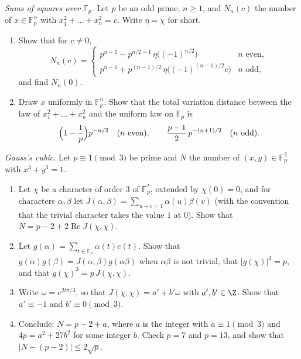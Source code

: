 \begin{exercise}[$\star\star$]\label{pb:sumsquares}
\emph{Sums of squares over $\mathbb F_p$.} Let $p$ be an odd prime, $n\ge1$, and $N_n(c)$ the number of $x\in\mathbb F_p^n$ with
$x_1^2+\dots+x_n^2=c$. Write $\eta=\chi$ for short.
\begin{enumerate}[label=(\alph*)]
\item Show that for $c\ne0$,
\[
N_n(c)=\begin{cases}p^{n-1}-p^{n/2-1}\,\eta\bigl((-1)^{n/2}\bigr)&n\text{ even},\\[2pt]
p^{n-1}+p^{(n-1)/2}\,\eta\bigl((-1)^{(n-1)/2}c\bigr)&n\text{ odd},\end{cases}
\]
and find $N_n(0)$.
\item Draw $x$ uniformly in $\mathbb F_p^n$. Show that the total variation distance between the law of $x_1^2+\dots+x_n^2$ and
the uniform law on $\mathbb F_p$ is
\[
\Bigl(1-\frac1p\Bigr)p^{-n/2}\quad(n\text{ even}),\qquad\frac{p-1}2\,p^{-(n+1)/2}\quad(n\text{ odd}).
\]
\end{enumerate}
\end{exercise}

\begin{exercise}[$\star\star\star$]\label{pb:fermatcubic}
\emph{Gauss's cubic.} Let $p\equiv1\pmod3$ be prime and $N$ the number of $(x,y)\in\mathbb F_p^2$ with $x^3+y^3=1$.
\begin{enumerate}[label=(\alph*)]
\item Let $\chi$ be a character of order $3$ of $\mathbb F_p^*$, extended by $\chi(0)=0$, and for characters $\alpha,\beta$
let $J(\alpha,\beta)=\sum_{u+v=1}\alpha(u)\beta(v)$ (with the convention that the trivial character takes the value $1$ at $0$).
Show that $N=p-2+2\operatorname{Re}J(\chi,\chi)$.
\item Let $g(\alpha)=\sum_{t\in\mathbb F_p}\alpha(t)e(t)$. Show that $g(\alpha)g(\beta)=J(\alpha,\beta)g(\alpha\beta)$ when
$\alpha\beta$ is not trivial, that $|g(\chi)|^2=p$, and that $g(\chi)^3=p\,J(\chi,\chi)$.
\item Write $\omega=e^{2i\pi/3}$, so that $J(\chi,\chi)=a'+b'\omega$ with $a',b'\in\Z$. Show that $a'\equiv-1$ and
$b'\equiv0\pmod 3$.
\item Conclude: $N=p-2+a$, where $a$ is the integer with $a\equiv1\pmod3$ and $4p=a^2+27b^2$ for some integer $b$. Check $p=7$
and $p=13$, and show that $|N-(p-2)|\le2\sqrt p$.
\end{enumerate}
\end{exercise}

